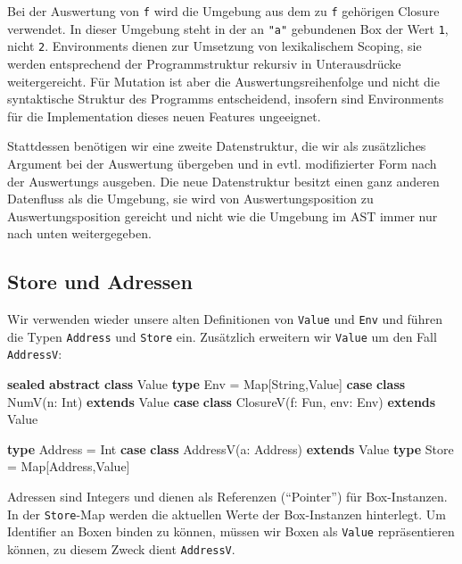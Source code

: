 \documentclass[]{article}
\newenvironment{Shaded}{}{}
\newcommand{\FunctionTok}[1]{\textcolor[rgb]{0.02,0.16,0.49}{#1}}
\newcommand{\KeywordTok}[1]{\textcolor[rgb]{0.00,0.44,0.13}{\textbf{#1}}}
\newcommand{\NormalTok}[1]{#1}
\begin{document}
Bei der Auswertung von \texttt{f} wird die Umgebung aus dem zu
\texttt{f} gehörigen Closure verwendet. In dieser Umgebung steht in der
an \texttt{"a"} gebundenen Box der Wert \texttt{1}, nicht \texttt{2}.
Environments dienen zur Umsetzung von lexikalischem Scoping, sie werden
entsprechend der Programmstruktur rekursiv in Unterausdrücke
weitergereicht. Für Mutation ist aber die Auswertungsreihenfolge und
nicht die syntaktische Struktur des Programms entscheidend, insofern
sind Environments für die Implementation dieses neuen Features
ungeeignet.

Stattdessen benötigen wir eine zweite Datenstruktur, die wir als
zusätzliches Argument bei der Auswertung übergeben und in evtl.
modifizierter Form nach der Auswertungs ausgeben. Die neue Datenstruktur
besitzt einen ganz anderen Datenfluss als die Umgebung, sie wird von
Auswertungsposition zu Auswertungsposition gereicht und nicht wie die
Umgebung im AST immer nur nach unten weitergegeben.

\hypertarget{store-und-adressen}{%
\subsection{Store und Adressen}\label{store-und-adressen}}

Wir verwenden wieder unsere alten Definitionen von \texttt{Value} und
\texttt{Env} und führen die Typen \texttt{Address} und \texttt{Store}
ein. Zusätzlich erweitern wir \texttt{Value} um den Fall
\texttt{AddressV}:

\begin{Shaded}
\begin{Highlighting}[]
\KeywordTok{sealed} \KeywordTok{abstract} \KeywordTok{class}\NormalTok{ Value}
\KeywordTok{type}\NormalTok{ Env = Map[String,Value]}
\KeywordTok{case} \KeywordTok{class} \FunctionTok{NumV}\NormalTok{(n: Int) }\KeywordTok{extends}\NormalTok{ Value}
\KeywordTok{case} \KeywordTok{class} \FunctionTok{ClosureV}\NormalTok{(f: Fun, env: Env) }\KeywordTok{extends}\NormalTok{ Value}

\KeywordTok{type}\NormalTok{ Address = Int}
\KeywordTok{case} \KeywordTok{class} \FunctionTok{AddressV}\NormalTok{(a: Address) }\KeywordTok{extends}\NormalTok{ Value}
\KeywordTok{type}\NormalTok{ Store = Map[Address,Value]}
\end{Highlighting}
\end{Shaded}

Adressen sind Integers und dienen als Referenzen (``Pointer'') für
Box-Instanzen. In der \texttt{Store}-Map werden die aktuellen Werte der
Box-Instanzen hinterlegt. Um Identifier an Boxen binden zu können,
müssen wir Boxen als \texttt{Value} repräsentieren können, zu diesem
Zweck dient \texttt{AddressV}.
\end{document}
